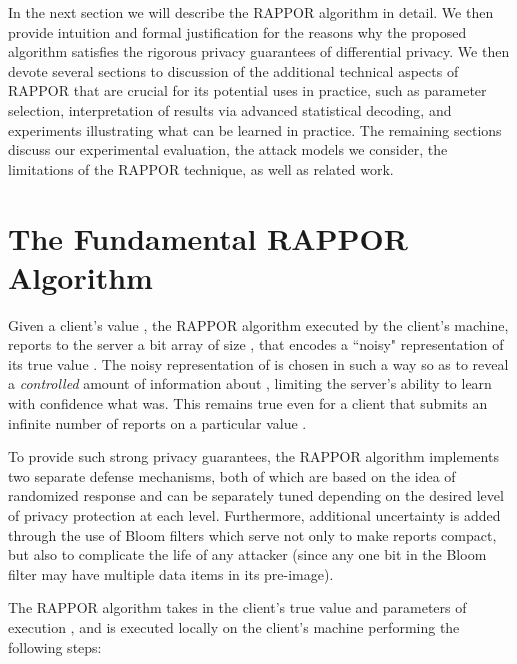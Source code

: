 \documentclass{sig-alternate-2013}
\newcommand\RAPPOR{{RAPPOR}}
\begin{document}
In the next section we will describe the \RAPPOR{} algorithm in detail. We then provide intuition and formal justification for the reasons why the proposed algorithm satisfies the rigorous privacy guarantees of differential privacy. We then devote several sections to discussion of the additional technical aspects of \RAPPOR{} that are crucial for its potential uses in practice, such as parameter selection, interpretation of results via advanced statistical decoding, and experiments illustrating what can be learned in practice. The remaining sections discuss our experimental evaluation, the attack models we consider, the limitations of the \RAPPOR{} technique, as well as related work.


\section{The Fundamental \RAPPOR{} Algorithm}
Given a client's value , the \RAPPOR{} algorithm executed by the client's machine, reports to the server a bit array of size , that encodes a ``noisy" representation of its true value . The noisy representation of  is chosen in such a way so as to reveal a \emph{controlled} amount of information about , limiting the server's ability to learn with confidence what  was. This remains true even for a client that submits an infinite number of reports on a particular value .

To provide such strong privacy guarantees, the \RAPPOR{} algorithm implements two separate defense mechanisms, both of which are based on the idea of randomized response and can be separately tuned depending on the desired level of privacy protection at each level. 
Furthermore, additional uncertainty is added through the use of Bloom filters which serve not only to make reports compact, but also to complicate the life of any attacker (since any one bit in the Bloom filter may have multiple data items in its pre-image).

The \RAPPOR{} algorithm takes in the client's true value  and parameters of execution , and is executed locally on the client's machine performing the following steps:
\end{document}
